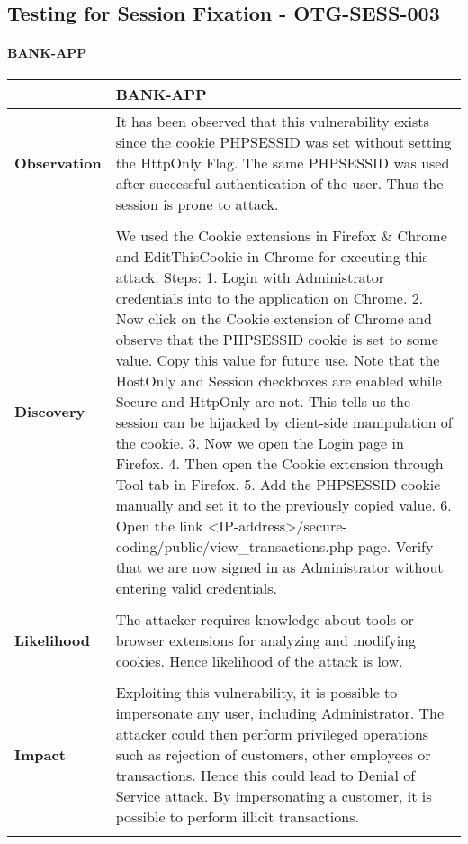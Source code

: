 \subsection{Testing for Session Fixation - OTG-SESS-003}
\paragraph{BANK-APP} \mbox{}
\begin{longtable*}{p{.20\textwidth} | p{.80\textwidth}}
    \hline
    & \textbf{BANK-APP} \\
    \hline
    \textbf{Observation} &
      It has been observed that this vulnerability exists since the cookie PHPSESSID was set without setting the HttpOnly Flag. The same PHPSESSID was used after successful authentication of the user. Thus the session is prone to attack.
    \\\\
    \textbf{Discovery} &
        We used the Cookie extensions in Firefox \& Chrome and EditThisCookie in Chrome for executing this attack.
        Steps:
        1. Login with Administrator credentials into to the application on Chrome. 2. Now click on the Cookie extension of Chrome and observe that the PHPSESSID cookie  is set to some value. Copy this value for future use. Note that the HostOnly and Session checkboxes are enabled while Secure and HttpOnly are not. This tells us the session can be hijacked by client-side manipulation of the cookie. 3. Now we open the Login page in Firefox. 4. Then open the Cookie extension through Tool tab in Firefox. 5. Add the PHPSESSID cookie manually and set it to the previously copied value. 6. Open the link <IP-address>/secure-coding/public/view\_transactions.php page.
        Verify that we are now signed in as Administrator without entering valid credentials.
    \\\\
    \textbf{Likelihood} &
        The attacker requires knowledge about tools or browser extensions for analyzing and modifying cookies. Hence likelihood of the attack is low.
    \\\\
    \textbf{Impact} &
        Exploiting this vulnerability, it is possible to impersonate any user, including Administrator. The attacker could then perform privileged operations such as rejection of customers, other employees or transactions. Hence this could lead to Denial of Service attack. By impersonating a customer, it is possible to perform illicit transactions.
    \\\\

\end{longtable*}
